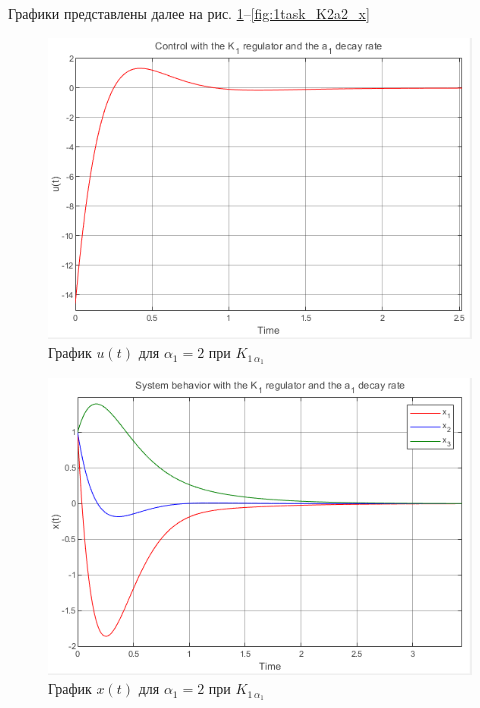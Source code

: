 \documentclass[a4paper, 12pt]{article}
\begin{document}
    
    Графики представлены далее на рис. \ref{fig:1task_K1a1_u}--\ref{fig:1task_K2a2_x}
    \newpage
    \vspace*{0.01mm}
    \begin{figure}[H]
        \centering
        \includegraphics{1task_K1a1_u.png}
        \captionsetup{skip=0pt}
        \caption{График $u(t)$ для $\alpha_1=2$ при $K_{1\,\alpha_1}$}
        \label{fig:1task_K1a1_u}
    \end{figure}
    \begin{figure}[H]
        \centering
        \includegraphics{1task_K1a1_x.png}
        \captionsetup{skip=0pt}
        \caption{График $x(t)$ для $\alpha_1=2$ при $K_{1\,\alpha_1}$}
        \label{fig:1task_K1a1_x}
    \end{figure}
    \newpage
    \vspace*{0.01mm}
\end{document}
